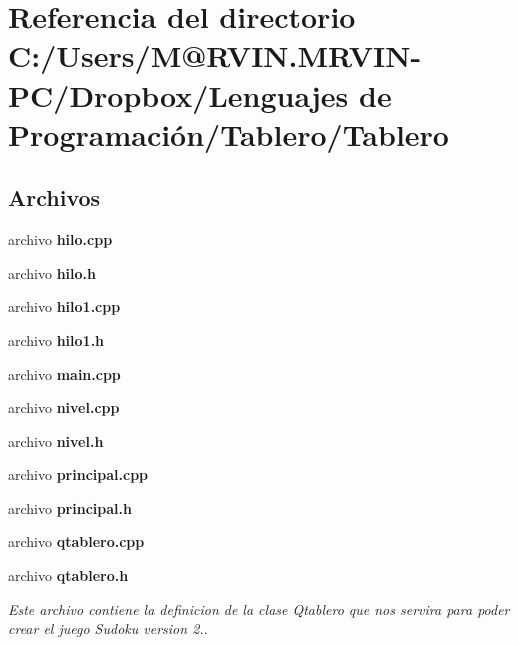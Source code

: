 \section{Referencia del directorio C\-:/\-Users/\-M@R\-V\-I\-N.\-M\-R\-V\-I\-N-\/\-P\-C/\-Dropbox/\-Lenguajes de Programación/\-Tablero/\-Tablero}
\label{dir_874157d6d82385d2e6a849c434c838c7}
\subsection*{Archivos}
\begin{DoxyCompactItemize}
\item 
archivo {\bfseries hilo.\-cpp}
\item 
archivo {\bfseries hilo.\-h}
\item 
archivo {\bfseries hilo1.\-cpp}
\item 
archivo {\bfseries hilo1.\-h}
\item 
archivo {\bfseries main.\-cpp}
\item 
archivo {\bfseries nivel.\-cpp}
\item 
archivo {\bfseries nivel.\-h}
\item 
archivo {\bfseries principal.\-cpp}
\item 
archivo {\bfseries principal.\-h}
\item 
archivo {\bfseries qtablero.\-cpp}
\item 
archivo {\bf qtablero.\-h}
\begin{DoxyCompactList}\small\item\em Este archivo contiene la definicion de la clase Qtablero que nos servira para poder crear el juego Sudoku version 2.. \end{DoxyCompactList}\end{DoxyCompactItemize}
